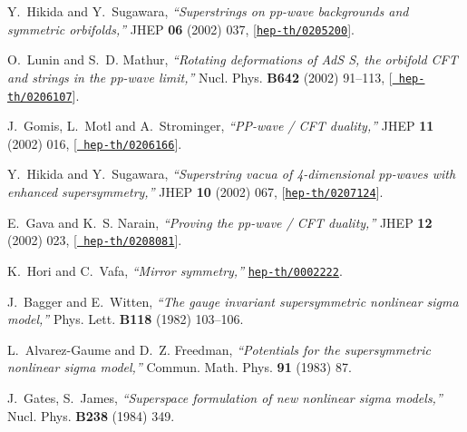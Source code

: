 \documentclass[a4paper,12pt]{article}
\numberwithin{equation}{section}
\begin{document}
\begin{thebibliography}{10}
Y.~Hikida and Y.~Sugawara, {\it ``Superstrings on pp-wave backgrounds and
  symmetric orbifolds,''}  JHEP {\bf 06} (2002) 037,
  [\href{http://arXiv.org/abs/hep-th/0205200}{{\tt hep-th/0205200}}].

O.~Lunin and S.~D. Mathur, {\it ``Rotating deformations of {AdS\myHighlight{$_3\times$}\coordHE{}
  S\coordHE{}}, the orbifold {CFT} and strings in the pp-wave limit,''}  Nucl. Phys.
  {\bf B642} (2002) 91--113, [\href{http://arXiv.org/abs/hep-th/0206107}{{\tt
  hep-th/0206107}}].

J.~Gomis, L.~Motl and A.~Strominger, {\it ``{PP}-wave / {CFT\coordHE{}} duality,''}
  JHEP {\bf 11} (2002) 016, [\href{http://arXiv.org/abs/hep-th/0206166}{{\tt
  hep-th/0206166}}].

Y.~Hikida and Y.~Sugawara, {\it ``Superstring vacua of 4-dimensional pp-waves
  with enhanced supersymmetry,''}  JHEP {\bf 10} (2002) 067,
  [\href{http://arXiv.org/abs/hep-th/0207124}{{\tt hep-th/0207124}}].

E.~Gava and K.~S. Narain, {\it ``Proving the pp-wave / {CFT\coordHE{}} duality,''}
  JHEP {\bf 12} (2002) 023, [\href{http://arXiv.org/abs/hep-th/0208081}{{\tt
  hep-th/0208081}}].

K.~Hori and C.~Vafa, {\it ``Mirror symmetry,''}
  \href{http://arXiv.org/abs/hep-th/0002222}{{\tt hep-th/0002222}}.

J.~Bagger and E.~Witten, {\it ``The gauge invariant supersymmetric nonlinear
  sigma model,''}  Phys. Lett. {\bf B118} (1982) 103--106.

L.~Alvarez-Gaume and D.~Z. Freedman, {\it ``Potentials for the supersymmetric
  nonlinear sigma model,''}  Commun. Math. Phys. {\bf 91} (1983) 87.

J.~Gates, S.~James, {\it ``Superspace formulation of new nonlinear sigma
  models,''}  Nucl. Phys. {\bf B238} (1984) 349.

\end{thebibliography}\endgroup
\end{document}
